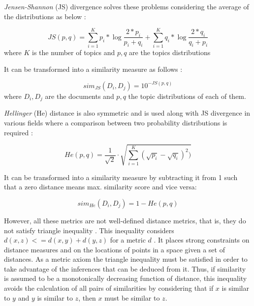 \textit{Jensen-Shannon} (JS) divergence \cite{Rao1982}\cite{Lin1991} solves these problems considering the average of the distributions as below \cite{Celikyilmaz2010}:

\begin{equation}
JS(p,q) = \sum\limits_{i=1}^K p_{i}*\log \frac{2*p_{i}}{p_{i}+q_{i}}  +  \sum\limits_{i=1}^K q_{i}*\log \frac{2*q_{i}}{q_{i}+p_{i}}
\label{eq:jsdivergence}
\end{equation}
where  $K$ is the number of topics and $p,q$ are the topics distributions

It can be transformed into a similarity measure as follows \cite{Dagan1998} :

\begin{equation}
sim_{JS}(D_i , D_j) = 10^{- JS(p,q)}
\label{eq:simjs}
\end{equation}
where  $D_i,D_j$ are the documents and $p,q$ the topic distributions of each of them.


\textit{Hellinger} (He) distance is also symmetric and is used along with JS divergence in various fields where a comparison between two probability distributions is required \cite{Blei2007a} \cite{Hall2008} \cite{Boyd-Graber2010}:

\begin{equation}
	He(p, q) = \frac{1}{\sqrt{2}}\cdot\sqrt{\sum\limits_{i=1}^K (\sqrt{p_i} - \sqrt{q_i})^2)}
	\label{eq:hedistance}
\end{equation}

It can be transformed into a similarity measure by subtracting it from 1 \cite{Rus2013} such that a zero distance means max. similarity score and vice versa:

\begin{equation}
	sim_{He}(D_i, D_j) = 1 - He(p,q)
	\label{eq:simhe}
\end{equation}

However, all these metrics are not well-defined distance metrics, that is, they do not satisfy triangle inequality \cite{Charikar2002}. This inequality considers $d(x, z) <= d(x, y) + d(y, z)$ for a metric $d$ \cite{Griffiths2007}. It places strong constraints on distance measures and on the locations of points in a space given a set of distances. As a metric axiom the triangle inequality must be satisfied in order to take advantage of the inferences that can be deduced from it. Thus, if similarity is assumed to be a monotonically decreasing function of distance, this inequality avoids the calculation of all pairs of similarities by considering that if $x$ is similar to $y$ and $y$ is similar to $z$, then $x$ must be similar to $z$. 

